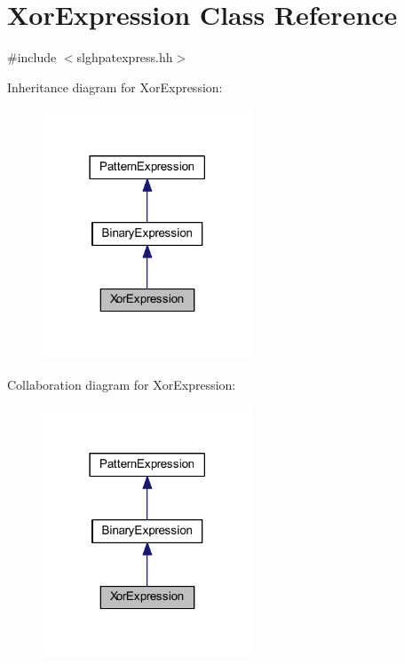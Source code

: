 \hypertarget{class_xor_expression}{}\section{Xor\+Expression Class Reference}
\label{class_xor_expression}


{\ttfamily \#include $<$slghpatexpress.\+hh$>$}



Inheritance diagram for Xor\+Expression\+:
\nopagebreak
\begin{figure}[H]
\begin{center}
\leavevmode
\includegraphics[width=177pt]{class_xor_expression__inherit__graph}
\end{center}
\end{figure}


Collaboration diagram for Xor\+Expression\+:
\nopagebreak
\begin{figure}[H]
\begin{center}
\leavevmode
\includegraphics[width=177pt]{class_xor_expression__coll__graph}
\end{center}
\end{figure}
